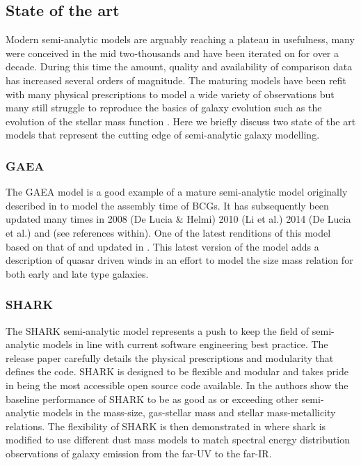 \subsection{State of the art}
Modern semi-analytic models are arguably reaching a plateau in usefulness, many were conceived in the mid two-thousands and have been iterated on for over a decade. During this time the amount, quality and availability of comparison data has increased several orders of magnitude. The maturing models have been refit with many physical prescriptions to model a wide variety of observations but many still struggle to reproduce the basics of galaxy evolution such as the evolution of the stellar mass function \cite{Asquith2018CosmicModels}. Here we briefly discuss two state of the art models that represent the cutting edge of semi-analytic galaxy modelling.

\subsubsection{GAEA}
The GAEA model is a good example of a mature semi-analytic model originally described in \citet{DeLucia2007TheGalaxies} to model the assembly time of BCGs. It has subsequently been updated many times in 2008 (De Lucia \& Helmi) 2010 (Li et al.) 2014 (De Lucia et al.) and \citet{Hirschmann2016GalaxyModel} (see references within).
One of the latest renditions of this model based on that of \citep{Xie2017H2-basedFormation} and updated in \citep{Zoldan2019TheEvolution}. This latest version of the model adds a description of quasar driven winds in an effort to model the size mass relation for both early and late type galaxies.

\subsubsection{SHARK}
The SHARK semi-analytic model represents a push to keep the field of semi-analytic models in line with current software engineering best practice. The release paper \citep{Lagos2018Shark:Formation} carefully details the physical prescriptions and modularity that defines the code. SHARK is designed to be flexible and modular and takes pride in being the most accessible open source code available. In \citet{Lagos2018Shark:Formation} the authors show the baseline performance of SHARK to be as good as or exceeding other semi-analytic models in the mass-size, gas-stellar mass and stellar mass-metallicity relations. The flexibility of SHARK is then demonstrated in \citet{Lagos2019FromModel} where  shark is modified to use different dust mass models to match spectral energy distribution observations of galaxy emission from the far-UV to the far-IR.

